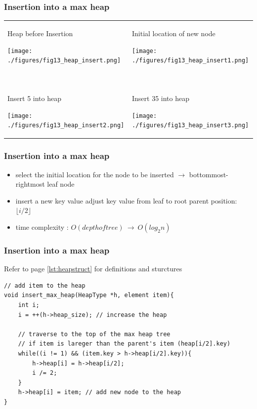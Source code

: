 \documentclass[newPxFont,sthlmFooter,nooffset]{beamer}
\begin{document}
\begin{frame}[t]
  \frametitle{Insertion into a max heap}
  \begin{tabular}{p{} p{}}
Heap before Insertion

    \texttt{[image: ./figures/fig13\_heap\_insert.png]}
&    
  Initial location of new node

    \texttt{[image: ./figures/fig13\_heap\_insert1.png]}
\pause \\
~& ~\\
Insert 5 into heap

    \texttt{[image: ./figures/fig13\_heap\_insert2.png]}
&
Insert 35 into heap

    \texttt{[image: ./figures/fig13\_heap\_insert3.png]}
\\
  \end{tabular}
\end{frame}


\begin{frame}[t]
  \frametitle{Insertion into a max heap}
  \begin{itemize}
  \item select the initial location for the node to be inserted $\rightarrow$
    bottommost-rightmost leaf node
  \item insert a new key value adjust key
    value from leaf to root parent position: $\lfloor i/2 \rfloor$
  \item time complexity :
    $O(depth of tree) ~\rightarrow~ O(log_2n)$
  \end{itemize}
\end{frame}


\begin{frame}[t, fragile]
  \frametitle{Insertion into a max heap}

Refer to page \ref{lst:heapstruct} for definitions and sturctures

  \begin{lstlisting}
// add item to the heap
void insert_max_heap(HeapType *h, element item){
    int i;
    i = ++(h->heap_size); // increase the heap

    // traverse to the top of the max heap tree
    // if item is lareger than the parent's item (heap[i/2].key)
    while((i != 1) && (item.key > h->heap[i/2].key)){
        h->heap[i] = h->heap[i/2];
        i /= 2;
    }
    h->heap[i] = item; // add new node to the heap
}
  \end{lstlisting}
\end{frame}
\end{document}
